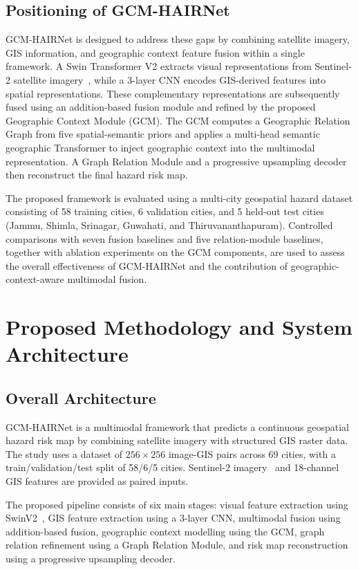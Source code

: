 \documentclass[sigconf, review=true]{acmart}
\begin{document}
\subsection{Positioning of GCM-HAIRNet}

GCM-HAIRNet is designed to address these gaps by combining satellite imagery, GIS information, and geographic context feature fusion within a single framework. A Swin Transformer V2 extracts visual representations from Sentinel-2 satellite imagery~\cite{drusch2012sentinel}, while a 3-layer CNN encodes GIS-derived features into spatial representations. These complementary representations are subsequently fused using an addition-based fusion module and refined by the proposed Geographic Context Module (GCM). The GCM computes a Geographic Relation Graph from five spatial-semantic priors and applies a multi-head semantic geographic Transformer to inject geographic context into the multimodal representation. A Graph Relation Module and a progressive upsampling decoder then reconstruct the final hazard risk map.

The proposed framework is evaluated using a multi-city geospatial hazard dataset consisting of 58 training cities, 6 validation cities, and 5 held-out test cities (Jammu, Shimla, Srinagar, Guwahati, and Thiruvananthapuram). Controlled comparisons with seven fusion baselines and five relation-module baselines, together with ablation experiments on the GCM components, are used to assess the overall effectiveness of GCM-HAIRNet and the contribution of geographic-context-aware multimodal fusion.

\section{Proposed Methodology and System Architecture}

\subsection{Overall Architecture}

GCM-HAIRNet is a multimodal framework that predicts a continuous geospatial hazard risk map by combining satellite imagery with structured GIS raster data. The study uses a dataset of $256\times256$ image-GIS pairs across 69 cities, with a train/validation/test split of 58/6/5 cities. Sentinel-2 imagery~\cite{drusch2012sentinel} and 18-channel GIS features are provided as paired inputs.

The proposed pipeline consists of six main stages: visual feature extraction using SwinV2~\cite{liu2022swinv2}, GIS feature extraction using a 3-layer CNN, multimodal fusion using addition-based fusion, geographic context modelling using the GCM, graph relation refinement using a Graph Relation Module, and risk map reconstruction using a progressive upsampling decoder.
\end{document}
